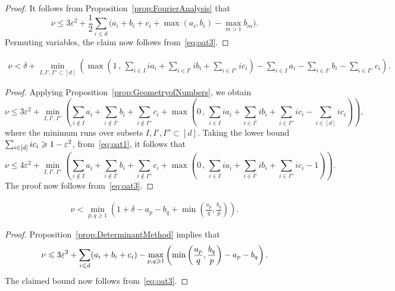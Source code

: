 \begin{proof}
  It follows from Proposition~\ref{prop:FourierAnalysis} that
  \[
  \nu \leq 3\varepsilon^2+
  \frac{1}{2}\sum_{i\leq d}\Big(a_i+b_i+c_i +\max(a_i,b_i) - \max_{m>1}b_m\Big).
  \]
  Permuting variables, the claim now follows from~\eqref{eq:oat3}.
\end{proof}

\begin{proposition}\label{prop:GeometryBound}
  \begin{align*}
  \nu < \delta + \min_{I,I',I''\subset [d]} \left(
  \max\left( 1 \,,\, \sum_{i\in I} ia_i +\sum_{i\in I'} ib_i + \sum_{i\in I''} ic_i\right) - \sum_{i\in I} a_i -\sum_{i\in I'} b_i - \sum_{i\in I''} c_i\right).
  \end{align*}
\end{proposition}
\begin{proof}
  Applying Proposition~\ref{prop:GeometryofNumbers}, we obtain
  \[
  \nu \leq 3\varepsilon^2+
  \min_{I,I',I''}
  \left( \sum_{i\notin I} a_i +\sum_{i\notin I'} b_i + \sum_{i\notin I''} c_i +
  \max\left( 0 \,,\, \sum_{i\in I} ia_i +\sum_{i\in I'} ib_i + \sum_{i\in I''} ic_i-
  \sum_{i\in [d]} ic_i
  \right)\right) ,
  \]
  where the minimum runs over subsets
  $I,I',I''\subset[d]$. Taking the lower bound
  $\sum_{i\in [d]} ic_i\geqslant 1-\varepsilon^2$,
  from~\eqref{eq:oat1},
  it follows that
  \begin{equation}
  \nu
  \leq 4\varepsilon^2+
  \min_{I,I',I''}
  \left( \sum_{i\notin I} a_i +\sum_{i\notin I'} b_i + \sum_{i\notin I''} c_i+
  \max\left( 0 \,,\, \sum_{i\in I} ia_i +\sum_{i\in I'} ib_i + \sum_{i\in I''} ic_i-1\right)\right).\label{eq:Geoalt}
  \end{equation}
  The proof now follows from~\eqref{eq:oat3}.
\end{proof}

\begin{proposition}\label{prop:DeterminantBound}
  \begin{align*}
    \nu < \min_{p,q\ge1} \left( 1+\delta- a_p - b_q +\min\left(\frac{a_p}{q}, \frac{b_q}{p}\right)\right).
  \end{align*}
\end{proposition}
\begin{proof}
  Proposition~\ref{prop:DeterminantMethod} implies
  that
  \[
  \nu\leqslant 3\varepsilon^2+
  \sum_{i\leqslant d} (a_i+b_i+c_i)
  -\max_{p,q\geqslant 1} \left(\min\left(
  \frac{a_p}{q}, \frac{b_q}{p}\right)
  -a_p-b_q\right).
  \]
  The claimed bound now follows from~\eqref{eq:oat3}.
\end{proof}

